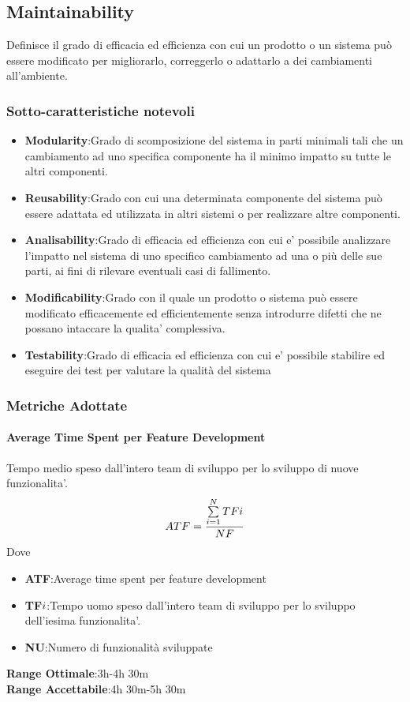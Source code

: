 \subsection{Maintainability}
Definisce il grado di efficacia ed efficienza con cui un prodotto o un sistema può essere modificato per migliorarlo, correggerlo o adattarlo a dei cambiamenti all'ambiente. 
\subsubsection{Sotto-caratteristiche notevoli}
\begin{itemize}
	\item{\textbf{Modularity}}:Grado di scomposizione del sistema in parti minimali tali che un cambiamento ad uno specifica componente ha il minimo impatto su tutte le altri componenti.
	\item{\textbf{Reusability}}:Grado con cui una determinata componente del sistema può essere adattata ed utilizzata in altri sistemi o per realizzare altre componenti.
	\item{\textbf{Analisability}}:Grado di efficacia ed efficienza con cui e' possibile analizzare l'impatto nel sistema di uno specifico cambiamento ad una o più delle sue parti, ai fini di rilevare eventuali casi di fallimento.
	\item{\textbf{Modificability}}:Grado con il quale un prodotto o sistema può essere modificato efficacemente ed efficientemente senza introdurre difetti che ne possano intaccare la qualita' complessiva.
	\item{\textbf{Testability}}:Grado di efficacia ed efficienza con cui e' possibile stabilire ed eseguire dei test per valutare la qualità del sistema
\end{itemize}
\subsubsection{Metriche Adottate}
\paragraph{Average Time Spent per Feature Development}
\begin{flushleft}
Tempo medio speso dall'intero team di sviluppo per lo sviluppo di nuove funzionalita'.
	$$ATF=\frac{\sum\limits_{i=1}^N TF{\small{i}}}{NF}$$
Dove
\begin{itemize}
	\item{\textbf{ATF}}:Average time spent per feature development
	\item{\textbf{TF${\small{i}}$}}:Tempo uomo speso dall'intero team di sviluppo per lo sviluppo dell'iesima funzionalita'.
	\item{\textbf{NU}}:Numero di funzionalità sviluppate
\end{itemize}
\textbf{Range Ottimale}:3h-4h 30m \\
\textbf{Range Accettabile}:4h 30m-5h 30m
\end{flushleft}
